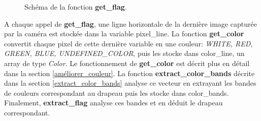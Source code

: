 \documentclass{article}
\begin{document}
    \begin{figure}[!ht]
        \noindent{}
        \caption{Schéma de la fonction \textbf{get\_flag}.}
        \label{fig:get_flag} %
    \end{figure}
    
    A chaque appel de \textbf{get\_flag}, une ligne horizontale de la dernière image capturée par la caméra est stockée dans la variable \textcolor{bleu}{pixel\_line}. 
    La fonction \textbf{get\_color} convertit chaque pixel de cette dernière variable en une couleur: \textit{WHITE, RED, GREEN, BLUE, UNDEFINED\_COLOR}, puis les stocke dans \textcolor{bleu}{color\_line}, un array de type \textit{Color}. 
    Le fonctionnement de \textbf{get\_color} est décrit plus en détail dans la section \ref{améliorer_couleur}. 
    La fonction \textbf{extract\_color\_bands} décrite dans la section \ref{extract_color_bands} analyse ce vecteur en extrayant les bandes de couleurs correspondant au drapeau puis les stocke dans \textcolor{bleu}{color\_bands}. 
    Finalement, \textbf{extract\_flag} analyse ces bandes et en déduit le drapeau correspondant.
    
\end{document}
